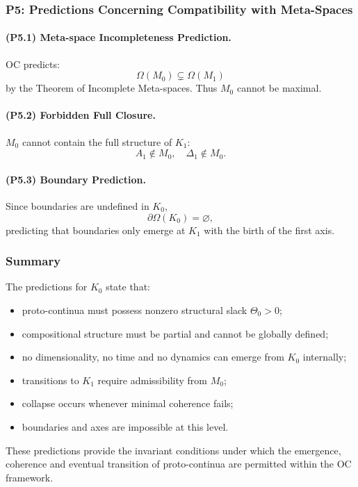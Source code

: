 \subsubsection{P5: Predictions Concerning Compatibility with Meta-Spaces}

\paragraph{(P5.1) Meta-space Incompleteness Prediction.}
OC predicts:
\[
\Omega(M_0) \subsetneq \Omega(M_1)
\]
by the Theorem of Incomplete Meta-spaces.
Thus $M_0$ cannot be maximal.

\paragraph{(P5.2) Forbidden Full Closure.}
$M_0$ cannot contain the full structure of $K_1$:
\[
A_1 \notin M_0,\quad \Delta_1 \notin M_0.
\]

\paragraph{(P5.3) Boundary Prediction.}
Since boundaries are undefined in $K_0$,
\[
\partial\Omega(K_0) = \varnothing,
\]
predicting that boundaries only emerge at $K_1$ with the birth of the first axis.

\subsubsection{Summary}

The predictions for $K_0$ state that:

\begin{itemize}
    \item proto-continua must possess nonzero structural slack $\Theta_0>0$;
    \item compositional structure must be partial and cannot be globally defined;
    \item no dimensionality, no time and no dynamics can emerge from $K_0$ internally;
    \item transitions to $K_1$ require admissibility from $M_0$;
    \item collapse occurs whenever minimal coherence fails;
    \item boundaries and axes are impossible at this level.
\end{itemize}

These predictions provide the invariant conditions under which
the emergence, coherence and eventual transition of proto-continua
are permitted within the OC framework.
